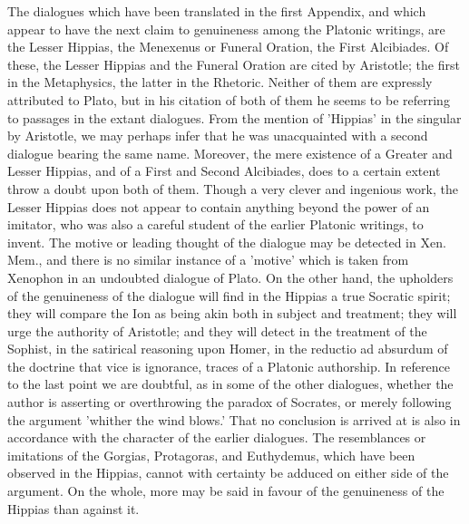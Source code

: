 \documentclass[11pt,letter]{article}
\begin{document}
\par  The dialogues which have been translated in the first Appendix, and which appear to have the next claim to genuineness among the Platonic writings, are the Lesser Hippias, the Menexenus or Funeral Oration, the First Alcibiades. Of these, the Lesser Hippias and the Funeral Oration are cited by Aristotle; the first in the Metaphysics, the latter in the Rhetoric. Neither of them are expressly attributed to Plato, but in his citation of both of them he seems to be referring to passages in the extant dialogues. From the mention of 'Hippias' in the singular by Aristotle, we may perhaps infer that he was unacquainted with a second dialogue bearing the same name. Moreover, the mere existence of a Greater and Lesser Hippias, and of a First and Second Alcibiades, does to a certain extent throw a doubt upon both of them. Though a very clever and ingenious work, the Lesser Hippias does not appear to contain anything beyond the power of an imitator, who was also a careful student of the earlier Platonic writings, to invent. The motive or leading thought of the dialogue may be detected in Xen. Mem., and there is no similar instance of a 'motive' which is taken from Xenophon in an undoubted dialogue of Plato. On the other hand, the upholders of the genuineness of the dialogue will find in the Hippias a true Socratic spirit; they will compare the Ion as being akin both in subject and treatment; they will urge the authority of Aristotle; and they will detect in the treatment of the Sophist, in the satirical reasoning upon Homer, in the reductio ad absurdum of the doctrine that vice is ignorance, traces of a Platonic authorship. In reference to the last point we are doubtful, as in some of the other dialogues, whether the author is asserting or overthrowing the paradox of Socrates, or merely following the argument 'whither the wind blows.' That no conclusion is arrived at is also in accordance with the character of the earlier dialogues. The resemblances or imitations of the Gorgias, Protagoras, and Euthydemus, which have been observed in the Hippias, cannot with certainty be adduced on either side of the argument. On the whole, more may be said in favour of the genuineness of the Hippias than against it.
\end{document}
